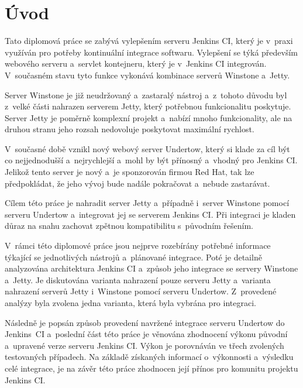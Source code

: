 
\chapter{Úvod}
    Tato diplomová práce se zabývá vylepšením serveru Jenkins CI, který je v~praxi využíván pro potřeby  
    kontinuální integrace softwaru. Vylepšení se týká především webového serveru a~servlet kontejneru, který je v~Jenkins CI integrován. 
    V~současném stavu tyto funkce vykonává kombinace serverů Winstone a~Jetty. 
        
    Server Winstone je již neudržovaný a~zastaralý nástroj a~z~tohoto důvodu
    byl z~velké části nahrazen serverem Jetty, který potřebnou funkcionalitu poskytuje. Server Jetty je poměrně komplexní projekt a~nabízí
    mnoho funkcionality, ale na druhou stranu jeho rozsah nedovoluje poskytovat maximální rychlost.
    
    V~současné době vznikl nový webový server Undertow, který si klade za cíl být co nejjednodušší a~nejrychlejší a~mohl by být přínosný
    a~vhodný pro Jenkins CI. Jelikož tento server je nový a~je sponzorován firmou Red Hat, tak lze předpokládat, že jeho vývoj
    bude nadále pokračovat a~nebude zastarávat.

    Cílem této práce je nahradit server Jetty a~případně i~server Winstone pomocí serveru Undertow 
    a~integrovat jej se serverem Jenkins CI. Při integraci je kladen důraz na snahu
    zachovat zpětnou kompatibilitu s~původním řešením. 

    V~rámci této diplomové práce jsou nejprve rozebírány potřebné informace týkající se jednotlivých nástrojů a~plánované integrace.
    Poté je detailně analyzována architektura Jenkins CI a~způsob jeho integrace se servery Winstone a~Jetty. 
    Je diskutována varianta nahrazení pouze serveru Jetty a~varianta nahrazení serverů Jetty i~Winstone pomocí serveru Undertow. 
    Z~provedené analýzy byla zvolena jedna varianta, která byla vybrána pro integraci. 

    Následně je popsán způsob provedení navržené integrace serveru Undertow do Jenkins~CI
    a~poslední část této práce je věnována zhodnocení výkonu původní a~upravené verze serveru Jenkins CI. Výkon
    je porovnáván ve třech zvolených testovaných případech. Na základě získaných informací o~výkonnosti 
    a~výsledku celé integrace, je na
    závěr této práce zhodnocen její přínos pro komunitu projektu Jenkins CI.

